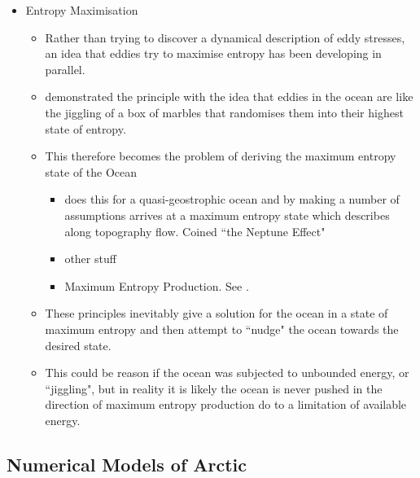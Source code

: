 \documentclass[10pt,a4paper]{article}
\begin{document}
                
                \begin{itemize}    
                	
                	\item Entropy  Maximisation
                	\begin{itemize}      
                		\item Rather than trying to discover a dynamical description of eddy stresses, an idea that eddies try to maximise entropy has been developing
                		in parallel.
                		\item \cite{holloway1987systematic} demonstrated the principle with
                		the idea that eddies in the ocean are like the jiggling of a box of 
                		marbles that randomises them into their highest state of entropy.
                		\item This therefore becomes the problem of deriving the maximum
                		entropy state of the Ocean
                		\begin{itemize}      
                			\item \cite{holloway1992representing} does this for a
                			 quasi-geostrophic ocean and by making a number of assumptions  
                			 arrives at a maximum entropy state which describes along 
                			 topography flow. Coined ``the Neptune Effect"
                			\item other stuff
                			\item Maximum Entropy Production. See \cite{polyakov2001eddy}.
                		\end{itemize}
                		\item These principles inevitably give a solution for the ocean in 
                		a state of maximum entropy and then attempt to ``nudge" the ocean
                		towards the desired state. 
                		\item This could be reason if the ocean was subjected to unbounded 
                		energy, or ``jiggling", but in reality it is likely the ocean is never
                		pushed in the direction of maximum entropy production do to
                		a limitation of available energy.
                	\end{itemize}  
                	
                \end{itemize}


\subsection{Numerical Models of Arctic}
\end{document}
